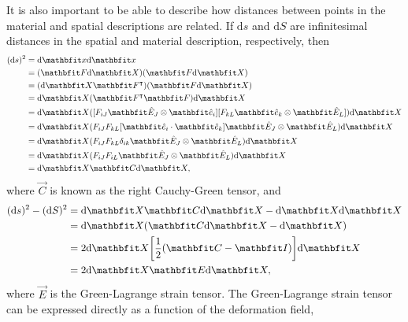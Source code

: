 It is also important to be able to describe how distances between points in the material and spatial descriptions are related.
If $\textrm{d} s$ and $\textrm{d} S$ are infinitesimal distances in the spatial and material description, respectively, then
\begin{align}
    (\textrm{d} s)^{2} &= \textrm{d} \vec{x} \textrm{d} \vec{x} \nonumber\\
                       &= (\vec{F} \textrm{d} \vec{X}) (\vec{F} \textrm{d} \vec{X}) \nonumber\\
                       &= (\textrm{d} \vec{X} \vec{F}^{\intercal}) (\vec{F} \textrm{d} \vec{X}) \nonumber\\
                       &= \textrm{d} \vec{X} (\vec{F}^{\intercal} \vec{F}) \textrm{d} \vec{X} \nonumber\\
                       &= \textrm{d} \vec{X} ([F_{iJ} \Unitvec_{J} \otimes \unitvec_{i}] [F_{kL} \unitvec_{k} \otimes \Unitvec_{L}]) \textrm{d} \vec{X} \nonumber\\
                       &= \textrm{d} \vec{X} (F_{iJ} F_{kL} [\unitvec_{i} \cdot \unitvec_{k}] \Unitvec_{J} \otimes \Unitvec_{L}) \textrm{d} \vec{X} \nonumber\\
                       &= \textrm{d} \vec{X} (F_{iJ} F_{kL} \delta_{ik} \Unitvec_{J} \otimes \Unitvec_{L}) \textrm{d} \vec{X} \nonumber\\
                       &= \textrm{d} \vec{X} (F_{iJ} F_{iL} \Unitvec_{J} \otimes \Unitvec_{L}) \textrm{d} \vec{X} \nonumber\\
                       &= \textrm{d} \vec{X} \vec{C} \textrm{d} \vec{X},
\end{align}
where $\vec{C}$ is known as the right Cauchy-Green tensor, and
\begin{align}
    (\textrm{d} s)^{2} - (\textrm{d} S)^{2} &= \textrm{d} \vec{X} \vec{C} \textrm{d} \vec{X} - \textrm{d} \vec{X} \textrm{d} \vec{X} \nonumber\\
                                            &= \textrm{d} \vec{X} (\vec{C} \textrm{d} \vec{X} - \textrm{d} \vec{X}) \nonumber\\
                                            &= 2 \textrm{d} \vec{X} \mleft[ \frac{1}{2} ( \vec{C} - \vec{I} ) \mright] \textrm{d} \vec{X} \nonumber\\
                                            &= 2 \textrm{d} \vec{X} \vec{E} \textrm{d} \vec{X},
\end{align}
where $\vec{E}$ is the Green-Lagrange strain tensor.
The Green-Lagrange strain tensor can be expressed directly as a function of the deformation field,
